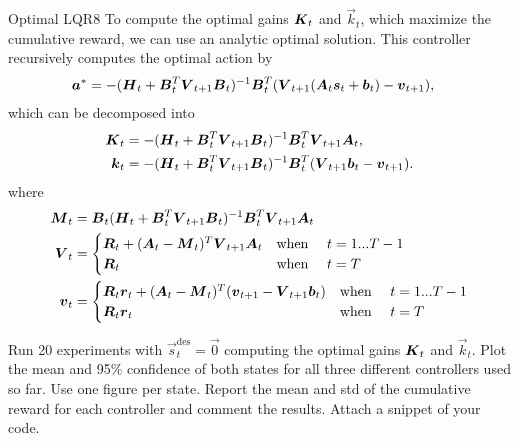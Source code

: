 \begin{questions}
	
\begin{question}{Optimal LQR}{8}
	To compute the optimal gains ${\boldsymbol{K}}_t$ and $\vec k_t$, which maximize the cumulative reward, we can use an analytic optimal solution. This controller recursively computes the optimal action by
	\begin{align}
		{\boldsymbol{a}}^* &= -({\boldsymbol{H}}_t + {\boldsymbol{B}}^T_t {\boldsymbol{V}}_{t+1}{\boldsymbol{B}}_t)^{-1}	{\boldsymbol{B}}^T_t ({\boldsymbol{V}}_{t+1} ({\boldsymbol{A}}_t {\boldsymbol{s}}_t+{\boldsymbol{b}}_t )- {\boldsymbol{v}}_{t+1} ),
	\end{align}
	which can be decomposed into
	\begin{align}
		{\boldsymbol{K}}_t &= -({\boldsymbol{H}}_t + {\boldsymbol{B}}^T_t {\boldsymbol{V}}_{t+1}{\boldsymbol{B}}_t)^{-1}	{\boldsymbol{B}}^T_t {\boldsymbol{V}}_{t+1} {\boldsymbol{A}}_t,
		\\
		{\boldsymbol{k}}_t &= -({\boldsymbol{H}}_t + {\boldsymbol{B}}^T_t {\boldsymbol{V}}_{t+1}{\boldsymbol{B}}_t)^{-1}	{\boldsymbol{B}}^T_t ({\boldsymbol{V}}_{t+1} {\boldsymbol{b}}_t - {\boldsymbol{v}}_{t+1}).
	\end{align}
	where
	\begin{align}
		{\boldsymbol{M}}_t &= {\boldsymbol{B}}_t({\boldsymbol{H}}_t + {\boldsymbol{B}}^T_t {\boldsymbol{V}}_{t+1}{\boldsymbol{B}}_t)^{-1}	{\boldsymbol{B}}^T_t {\boldsymbol{V}}_{t+1} {\boldsymbol{A}}_t
		\\
		{\boldsymbol{V}}_t &=
		\begin{cases}
	       {\boldsymbol{R}}_t + ({\boldsymbol{A}}_t - {\boldsymbol{M}}_t)^T{\boldsymbol{V}}_{t+1}{\boldsymbol{A}}_t & \text{when \quad} t = 1...T-1
	       \\
	       {\boldsymbol{R}}_t & \text{when \quad} t = T
	    \end{cases}
	    \\
		{\boldsymbol{v}}_t &= 
		\begin{cases}
	       {\boldsymbol{R}}_t{\boldsymbol{r}}_t + ({\boldsymbol{A}}_t - {\boldsymbol{M}}_t)^T({\boldsymbol{v}}_{t+1} - {\boldsymbol{V}}_{t+1}{\boldsymbol{b}}_t) & \text{when \quad} t = 1...T-1
	       \\
	       {\boldsymbol{R}}_t{\boldsymbol{r}}_t & \text{when \quad} t = T
	    \end{cases}
	\end{align}		 

	Run 20 experiments with $\vec s^\text{des}_t = \vec 0$ computing the optimal gains ${\boldsymbol{K}}_t$ and $\vec k_t$. Plot the mean and 95\% confidence of both states for all three different controllers used so far. Use one figure per state. 
	Report the mean and std of the cumulative reward for each controller and comment the results. Attach a snippet of your code.

\begin{answer}\end{answer}

\end{question}


\end{questions}
